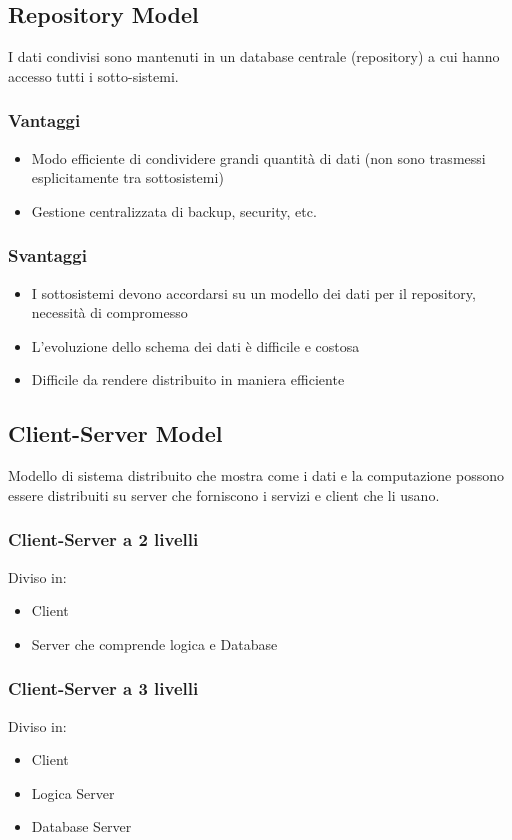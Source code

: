 \subsection{Repository Model}
I dati condivisi sono mantenuti in un database centrale (repository) a cui hanno accesso tutti i sotto-sistemi.

\subsubsection{Vantaggi}
\begin{itemize}
    \item Modo efficiente di condividere grandi quantità di dati (non sono trasmessi esplicitamente tra sottosistemi)
    \item Gestione centralizzata di backup, security, etc.
\end{itemize}

\subsubsection{Svantaggi}
\begin{itemize}
    \item I sottosistemi devono accordarsi su un modello dei dati per il repository, necessità di compromesso
    \item L’evoluzione dello schema dei dati è difficile e costosa
    \item Difficile da rendere distribuito in maniera efficiente
\end{itemize}

\subsection{Client-Server Model}
Modello di sistema distribuito che mostra come i dati e la computazione possono essere distribuiti su server che forniscono i servizi e client che li usano.

\subsubsection{Client-Server a 2 livelli}
Diviso in:
\begin{itemize}
    \item Client
    \item Server che comprende logica e Database
\end{itemize}

\subsubsection{Client-Server a 3 livelli}
Diviso in:
\begin{itemize}
    \item Client
    \item Logica Server
    \item Database Server
\end{itemize}

